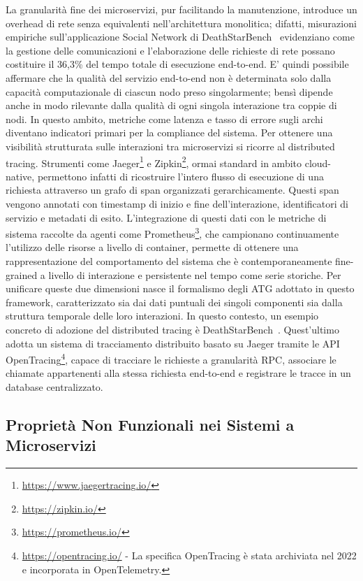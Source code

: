La granularità fine dei microservizi, pur facilitando la manutenzione, introduce un overhead 
di rete senza equivalenti nell'architettura monolitica; difatti, misurazioni empiriche 
sull'applicazione Social Network di DeathStarBench~\cite{gan2019deathstar} evidenziano come la gestione delle 
comunicazioni e l'elaborazione delle richieste di rete possano costituire il 36,3\% del tempo totale 
di esecuzione end-to-end. E' quindi possibile affermare che la qualità del servizio end-to-end 
non è determinata solo dalla capacità computazionale di ciascun nodo preso singolarmente; 
bensì dipende anche in modo rilevante dalla qualità di ogni singola interazione tra 
coppie di nodi. In questo ambito, metriche come latenza e tasso di errore sugli archi diventano 
indicatori primari per la compliance del sistema.
Per ottenere una visibilità strutturata sulle interazioni tra microservizi si ricorre 
al distributed tracing. Strumenti come Jaeger\footnote{\url{https://www.jaegertracing.io/}} e Zipkin\footnote{\url{https://zipkin.io/}}, 
ormai standard in ambito cloud-native, 
permettono infatti di ricostruire l'intero flusso di esecuzione di una richiesta attraverso 
un grafo di span organizzati gerarchicamente. Questi span vengono annotati con timestamp 
di inizio e fine dell'interazione, identificatori di servizio e metadati di esito. L'integrazione di 
questi dati con le metriche di sistema raccolte da agenti come Prometheus\footnote{\url{https://prometheus.io/}}, che campionano 
continuamente l'utilizzo delle risorse a livello di container, permette di ottenere una 
rappresentazione del comportamento del sistema che è contemporaneamente fine-grained a livello 
di interazione e persistente nel tempo come serie storiche. Per unificare queste due dimensioni 
nasce il formalismo degli \gls{ATG} adottato in questo framework, caratterizzato sia dai dati puntuali dei 
singoli componenti sia dalla struttura temporale delle loro interazioni. In questo contesto, 
un esempio concreto di adozione del distributed tracing è DeathStarBench~\cite{gan2019deathstar}. Quest'ultimo adotta un 
sistema di tracciamento distribuito basato su Jaeger tramite le \gls{API} OpenTracing\footnote{\url{https://opentracing.io/} - 
La specifica OpenTracing è stata archiviata nel 2022 e incorporata in OpenTelemetry.}, capace di tracciare 
le richieste a granularità \gls{RPC}, associare le chiamate appartenenti alla stessa richiesta end-to-end 
e registrare le tracce in un database centralizzato. 

\subsection{Proprietà Non Funzionali nei Sistemi a Microservizi}
\label{subsec:proprieta_nonfunzionali}

